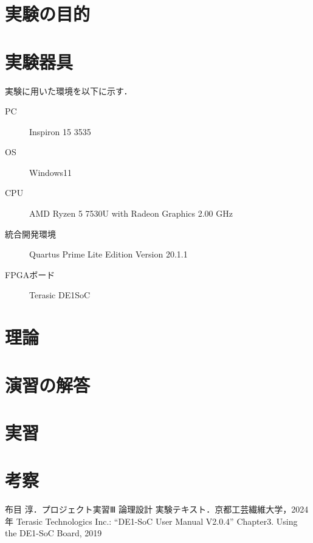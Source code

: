 \documentclass{jlreq}
\numberwithin{equation}{section}
\begin{document}
\tableofcontents
\clearpage

\section{実験の目的}

\section{実験器具}
実験に用いた環境を以下に示す．
\begin{description}
  \item[PC] Inspiron 15 3535
  \item[OS] Windows11
  \item[CPU] AMD Ryzen 5 7530U with Radeon Graphics 2.00 GHz
  \item[統合開発環境] Quartus Prime Lite Edition Version 20.1.1
  \item[FPGAボード] Terasic DE1SoC
\end{description}

\section{理論}

\section{演習の解答}

\section{実習}

\section{考察}

\begin{thebibliography}{9}
   布目 淳．プロジェクト実習Ⅲ 論理設計 実験テキスト．京都工芸繊維大学，2024年
   Terasic Technologics Inc.:  ``DE1-SoC User Manual V2.0.4'' Chapter3. Using the DE1-SoC Board, 2019
\end{thebibliography}
\end{document}
